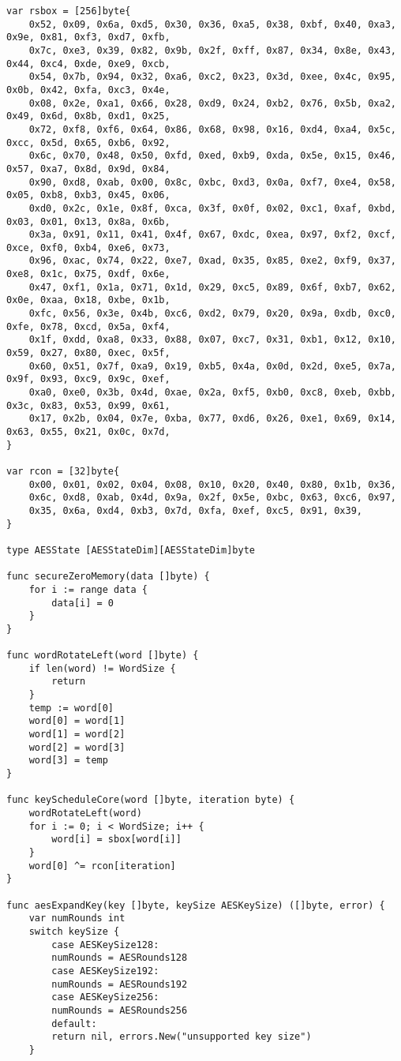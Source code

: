 \begin{lstlisting}[style=golang, caption={Реализация алгоритма симметричного шифрования (AЕS)}, label=lst:codegolang]
var rsbox = [256]byte{
	0x52, 0x09, 0x6a, 0xd5, 0x30, 0x36, 0xa5, 0x38, 0xbf, 0x40, 0xa3, 0x9e, 0x81, 0xf3, 0xd7, 0xfb,
	0x7c, 0xe3, 0x39, 0x82, 0x9b, 0x2f, 0xff, 0x87, 0x34, 0x8e, 0x43, 0x44, 0xc4, 0xde, 0xe9, 0xcb,
	0x54, 0x7b, 0x94, 0x32, 0xa6, 0xc2, 0x23, 0x3d, 0xee, 0x4c, 0x95, 0x0b, 0x42, 0xfa, 0xc3, 0x4e,
	0x08, 0x2e, 0xa1, 0x66, 0x28, 0xd9, 0x24, 0xb2, 0x76, 0x5b, 0xa2, 0x49, 0x6d, 0x8b, 0xd1, 0x25,
	0x72, 0xf8, 0xf6, 0x64, 0x86, 0x68, 0x98, 0x16, 0xd4, 0xa4, 0x5c, 0xcc, 0x5d, 0x65, 0xb6, 0x92,
	0x6c, 0x70, 0x48, 0x50, 0xfd, 0xed, 0xb9, 0xda, 0x5e, 0x15, 0x46, 0x57, 0xa7, 0x8d, 0x9d, 0x84,
	0x90, 0xd8, 0xab, 0x00, 0x8c, 0xbc, 0xd3, 0x0a, 0xf7, 0xe4, 0x58, 0x05, 0xb8, 0xb3, 0x45, 0x06,
	0xd0, 0x2c, 0x1e, 0x8f, 0xca, 0x3f, 0x0f, 0x02, 0xc1, 0xaf, 0xbd, 0x03, 0x01, 0x13, 0x8a, 0x6b,
	0x3a, 0x91, 0x11, 0x41, 0x4f, 0x67, 0xdc, 0xea, 0x97, 0xf2, 0xcf, 0xce, 0xf0, 0xb4, 0xe6, 0x73,
	0x96, 0xac, 0x74, 0x22, 0xe7, 0xad, 0x35, 0x85, 0xe2, 0xf9, 0x37, 0xe8, 0x1c, 0x75, 0xdf, 0x6e,
	0x47, 0xf1, 0x1a, 0x71, 0x1d, 0x29, 0xc5, 0x89, 0x6f, 0xb7, 0x62, 0x0e, 0xaa, 0x18, 0xbe, 0x1b,
	0xfc, 0x56, 0x3e, 0x4b, 0xc6, 0xd2, 0x79, 0x20, 0x9a, 0xdb, 0xc0, 0xfe, 0x78, 0xcd, 0x5a, 0xf4,
	0x1f, 0xdd, 0xa8, 0x33, 0x88, 0x07, 0xc7, 0x31, 0xb1, 0x12, 0x10, 0x59, 0x27, 0x80, 0xec, 0x5f,
	0x60, 0x51, 0x7f, 0xa9, 0x19, 0xb5, 0x4a, 0x0d, 0x2d, 0xe5, 0x7a, 0x9f, 0x93, 0xc9, 0x9c, 0xef,
	0xa0, 0xe0, 0x3b, 0x4d, 0xae, 0x2a, 0xf5, 0xb0, 0xc8, 0xeb, 0xbb, 0x3c, 0x83, 0x53, 0x99, 0x61,
	0x17, 0x2b, 0x04, 0x7e, 0xba, 0x77, 0xd6, 0x26, 0xe1, 0x69, 0x14, 0x63, 0x55, 0x21, 0x0c, 0x7d,
}

var rcon = [32]byte{
	0x00, 0x01, 0x02, 0x04, 0x08, 0x10, 0x20, 0x40, 0x80, 0x1b, 0x36,
	0x6c, 0xd8, 0xab, 0x4d, 0x9a, 0x2f, 0x5e, 0xbc, 0x63, 0xc6, 0x97,
	0x35, 0x6a, 0xd4, 0xb3, 0x7d, 0xfa, 0xef, 0xc5, 0x91, 0x39,
}

type AESState [AESStateDim][AESStateDim]byte

func secureZeroMemory(data []byte) {
	for i := range data {
		data[i] = 0
	}
}

func wordRotateLeft(word []byte) {
	if len(word) != WordSize {
		return
	}
	temp := word[0]
	word[0] = word[1]
	word[1] = word[2]
	word[2] = word[3]
	word[3] = temp
}

func keyScheduleCore(word []byte, iteration byte) {
	wordRotateLeft(word)
	for i := 0; i < WordSize; i++ {
		word[i] = sbox[word[i]]
	}
	word[0] ^= rcon[iteration]
}

func aesExpandKey(key []byte, keySize AESKeySize) ([]byte, error) {
	var numRounds int
	switch keySize {
		case AESKeySize128:
		numRounds = AESRounds128
		case AESKeySize192:
		numRounds = AESRounds192
		case AESKeySize256:
		numRounds = AESRounds256
		default:
		return nil, errors.New("unsupported key size")
	}
	

\end{lstlisting}
